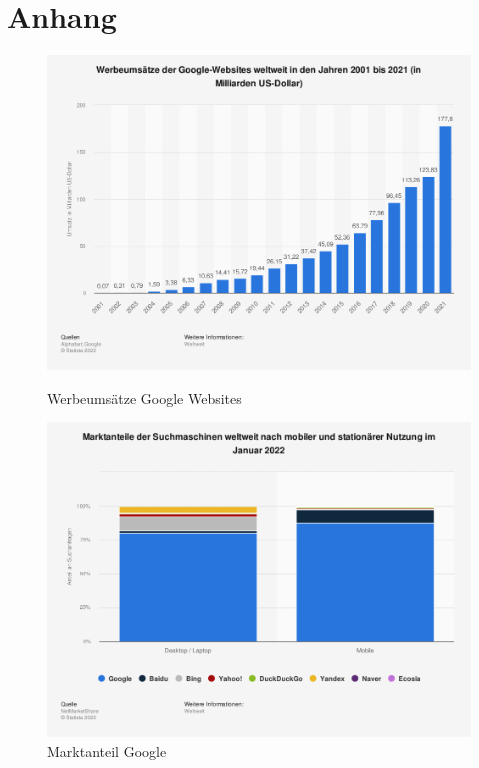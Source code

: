 
\appendix
\renewcommand{\thechapter}{\Alph{chapter}}
\renewcommand{\thesection}{\Roman{section}}
\renewcommand{\thesubsection}{\Roman{section}}

\chapter{Anhang}
\label{appendix:annex}

\begin{figure}
  \includegraphics[width=\textwidth]{figures/appendix/werbeumsatz.png}
  \caption{\label{fig:werbeumsatz} Werbeumsätze Google Websites \cite{alphabet2022}}
  \includegraphics[width=\textwidth]{figures/appendix/marketshare.png}
  \caption{\label{fig:marketshare} Marktanteil Google \cite{netmarketshare2022}}
\end{figure}

